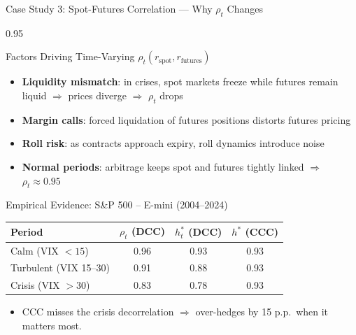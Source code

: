 \documentclass[9pt, aspectratio=169, t]{beamer}
\begin{document}
\begin{frame}{Case Study 3: Spot-Futures Correlation --- Why $\rho_t$ Changes}
    \begin{cminipage}{0.95\textwidth}
    {\footnotesize
    \begin{block}{Factors Driving Time-Varying $\rho_t(r_{\text{spot}}, r_{\text{futures}})$}
        \begin{itemize}\setlength{\itemsep}{1pt}
            \item \textbf{Liquidity mismatch}: in crises, spot markets freeze while futures remain liquid $\Rightarrow$ prices diverge $\Rightarrow$ $\rho_t$ drops
            \item \textbf{Margin calls}: forced liquidation of futures positions distorts futures pricing
            \item \textbf{Roll risk}: as contracts approach expiry, roll dynamics introduce noise
            \item \textbf{Normal periods}: arbitrage keeps spot and futures tightly linked $\Rightarrow$ $\rho_t \approx 0.95$
        \end{itemize}
    \end{block}
    \begin{exampleblock}{Empirical Evidence: S\&P 500 -- E-mini (2004--2024)}
        {\small
        \begin{center}
        \begin{tabular}{l|ccc}
            \hline
            \textbf{Period} & $\rho_t$ (DCC) & $h_t^*$ (DCC) & $h^*$ (CCC) \\
            \hline
            Calm (VIX $< 15$)       & 0.96 & 0.93 & 0.93 \\
            Turbulent (VIX 15--30)  & 0.91 & 0.88 & 0.93 \\
            Crisis (VIX $> 30$)     & 0.83 & 0.78 & 0.93 \\
            \hline
        \end{tabular}
        \end{center}
        }
        \begin{itemize}\setlength{\itemsep}{0pt}
            \item CCC misses the crisis decorrelation $\Rightarrow$ over-hedges by 15 p.p.\ when it matters most.
        \end{itemize}
    \end{exampleblock}
    }
    \end{cminipage}
\end{frame}
\end{document}
